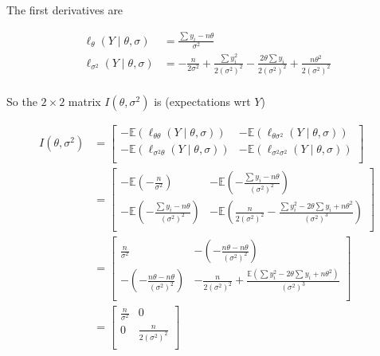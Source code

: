 \documentclass[]{article}
\begin{document}
The first derivatives are

\begin{align}
\ell_\theta(Y \mid \theta, \sigma) &= \frac{\sum y_i - n\theta}{\sigma^2} \\
\ell_{\sigma^2}(Y \mid \theta, \sigma) &= -\frac{n}{2\sigma^2} + \frac{\sum y_i^2}{2(\sigma^2)^2} - \frac{2\theta \sum y_i}{2(\sigma^2)^2} + \frac{n\theta^2}{2(\sigma^2)^2} \\
\end{align}

So the \(2 \times 2\) matrix \(I(\theta, \sigma^2)\) is (expectations
wrt \(Y\))

\begin{align}
I(\theta, \sigma^2) &=
\begin{bmatrix}
-\mathbb{E}\left( \ell_{\theta\theta}(Y \mid \theta, \sigma) \right) & -\mathbb{E}\left( \ell_{\theta\sigma^2}(Y \mid \theta, \sigma) \right) \\
-\mathbb{E}\left( \ell_{\sigma^2\theta}(Y \mid \theta, \sigma) \right) & -\mathbb{E}\left( \ell_{\sigma^2\sigma^2}(Y \mid \theta, \sigma) \right)\\
\end{bmatrix} \\
&= \begin{bmatrix}
-\mathbb{E}\left( -\frac{n}{\sigma^2} \right) &
-\mathbb{E}\left( -\frac{\sum y_i - n\theta}{(\sigma^2)^2}\right) \\
-\mathbb{E}\left( -\frac{\sum y_i - n\theta}{(\sigma^2)^2}\right) &
-\mathbb{E}\left( \frac{n}{2(\sigma^2)^2} - \frac{\sum y_i^2 - 2\theta\sum y_i + n\theta^2}{(\sigma^2)^3}\right) \\
\end{bmatrix} \\
&= \begin{bmatrix}
\frac{n}{\sigma^2} &
-\left( -\frac{n\theta - n\theta}{(\sigma^2)^2} \right) \\
-\left( -\frac{n\theta - n\theta}{(\sigma^2)^2} \right) &
-\frac{n}{2(\sigma^2)^2} + \frac{\mathbb{E}(\sum y_i^2 - 2\theta\sum y_i + n\theta^2)}{(\sigma^2)^3} \\
\end{bmatrix} \\
&= \begin{bmatrix}
\frac{n}{\sigma^2} &
0 \\
0 &
\frac{n}{2(\sigma^2)^2} \\
\end{bmatrix}
\end{align}
\end{document}

